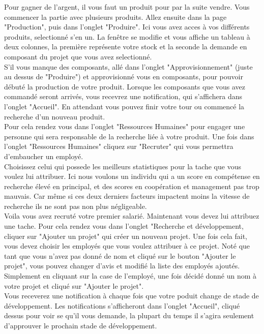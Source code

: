 \clearpage



Pour gagner de l'argent, il vous faut un produit pour par la suite vendre. Vous commencer la partie avec plusieurs produits. Allez ensuite dans la page "Production", puis dans l'onglet "Produire". Ici vous avez acces à vos différents produits, selectionné s'en un. La fenêtre se modifie et vous affiche un tableau à deux colonnes, la première représente votre stock et la seconde la demande en composant du projet que vous avez selectionné.\\

S'il vous manque des composants, allé dans l'onglet "Approvisionnement" (juste au dessus de "Produire") et approvisionné vous en composants, pour pouvoir débuté la production de votre produit. Lorsque les composants que vous avez commandé seront arrivés, vous recevrez une notification, qui s'affichera dans l'onglet "Accueil". En attendant vous pouvez finir votre tour ou commencé la recherche d'un nouveau produit.
\\

Pour cela rendez vous dans l'onglet "Ressources Humaines" pour engager une personne qui sera responsable de la recherche liée à votre produit. Une fois dans l'onglet "Ressources Humaines" cliquez sur "Recruter" qui vous permettra d'embaucher un employé. \\

Choisissez celui qui possede les meilleurs statistiques pour la tache que vous voulez lui attribuer. Ici nous voulons un individu qui a un score en compétense en recherche élevé en principal, et des scores en coopération et management pas trop mauvais. Car même si ces deux derniers facteurs impactent moins la vitesse de recherche ils ne sont pas non plus négligeable.\\

Voila vous avez recruté votre premier salarié. Maintenant vous devez lui attribuez une tache. Pour cela rendez vous dans l'onglet "Recherche et développement, cliquer sur "Ajouter un projet" qui créer un nouveau projet. Une fois cela fait, vous devez choisir les employés que vous voulez attribuer à ce projet. Noté que tant que vous n'avez pas donné de nom et cliqué sur le bouton "Ajouter le projet", vous pouvez changer d'avis et modifié la liste des employés ajoutés. Simplement en cliquant sur la case de l'employé, une fois décidé donné un nom à votre projet et cliqué sur "Ajouter le projet".\\

Vous receverez une notification à chaque fois que votre poduit change de stade de développement. Les notifications s'afficheront dans l'onglet "Accueil", cliqué dessus pour voir se qu'il vous demande, la plupart du temps il s'agira seulement d'approuver le prochain stade de développement.
\\

